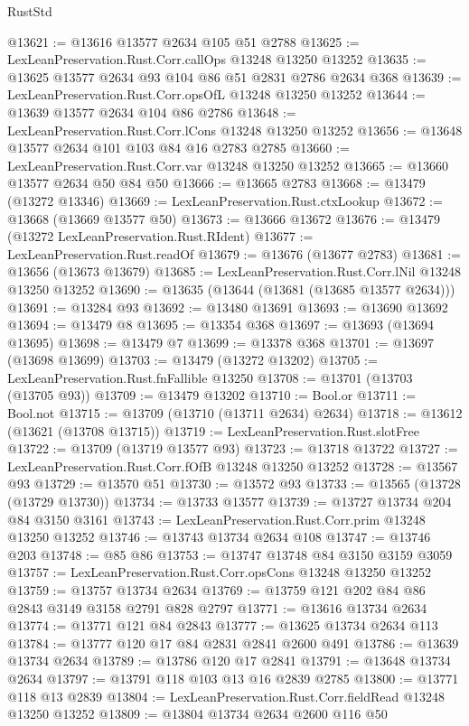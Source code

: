 \begin{lexlean}{RustStd}
\begin{coremodule}
@13621 := @13616 @13577 @2634 @105 @51 @2788
@13625 := LexLeanPreservation.Rust.Corr.callOps @13248 @13250 @13252
@13635 := @13625 @13577 @2634 @93 @104 @86 @51 @2831 @2786 @2634 @368
@13639 := LexLeanPreservation.Rust.Corr.opsOfL @13248 @13250 @13252
@13644 := @13639 @13577 @2634 @104 @86 @2786
@13648 := LexLeanPreservation.Rust.Corr.lCons @13248 @13250 @13252
@13656 := @13648 @13577 @2634 @101 @103 @84 @16 @2783 @2785
@13660 := LexLeanPreservation.Rust.Corr.var @13248 @13250 @13252
@13665 := @13660 @13577 @2634 @50 @84 @50
@13666 := @13665 @2783
@13668 := @13479 (@13272 @13346)
@13669 := LexLeanPreservation.Rust.ctxLookup
@13672 := @13668 (@13669 @13577 @50)
@13673 := @13666 @13672
@13676 := @13479 (@13272 LexLeanPreservation.Rust.RIdent)
@13677 := LexLeanPreservation.Rust.readOf
@13679 := @13676 (@13677 @2783)
@13681 := @13656 (@13673 @13679)
@13685 := LexLeanPreservation.Rust.Corr.lNil @13248 @13250 @13252
@13690 := @13635 (@13644 (@13681 (@13685 @13577 @2634)))
@13691 := @13284 @93
@13692 := @13480 @13691
@13693 := @13690 @13692
@13694 := @13479 @8
@13695 := @13354 @368
@13697 := @13693 (@13694 @13695)
@13698 := @13479 @7
@13699 := @13378 @368
@13701 := @13697 (@13698 @13699)
@13703 := @13479 (@13272 @13202)
@13705 := LexLeanPreservation.Rust.fnFallible @13250
@13708 := @13701 (@13703 (@13705 @93))
@13709 := @13479 @13202
@13710 := Bool.or
@13711 := Bool.not
@13715 := @13709 (@13710 (@13711 @2634) @2634)
@13718 := @13612 (@13621 (@13708 @13715))
@13719 := LexLeanPreservation.Rust.slotFree
@13722 := @13709 (@13719 @13577 @93)
@13723 := @13718 @13722
@13727 := LexLeanPreservation.Rust.Corr.fOfB @13248 @13250 @13252
@13728 := @13567 @93
@13729 := @13570 @51
@13730 := @13572 @93
@13733 := @13565 (@13728 (@13729 @13730))
@13734 := @13733 @13577
@13739 := @13727 @13734 @204 @84 @3150 @3161
@13743 := LexLeanPreservation.Rust.Corr.prim @13248 @13250 @13252
@13746 := @13743 @13734 @2634 @108
@13747 := @13746 @203
@13748 := @85 @86
@13753 := @13747 @13748 @84 @3150 @3159 @3059
@13757 := LexLeanPreservation.Rust.Corr.opsCons @13248 @13250 @13252
@13759 := @13757 @13734 @2634
@13769 := @13759 @121 @202 @84 @86 @2843 @3149 @3158 @2791 @828 @2797
@13771 := @13616 @13734 @2634
@13774 := @13771 @121 @84 @2843
@13777 := @13625 @13734 @2634 @113
@13784 := @13777 @120 @17 @84 @2831 @2841 @2600 @491
@13786 := @13639 @13734 @2634
@13789 := @13786 @120 @17 @2841
@13791 := @13648 @13734 @2634
@13797 := @13791 @118 @103 @13 @16 @2839 @2785
@13800 := @13771 @118 @13 @2839
@13804 := LexLeanPreservation.Rust.Corr.fieldRead @13248 @13250 @13252
@13809 := @13804 @13734 @2634 @2600 @116 @50

\end{coremodule}
\end{lexlean}
